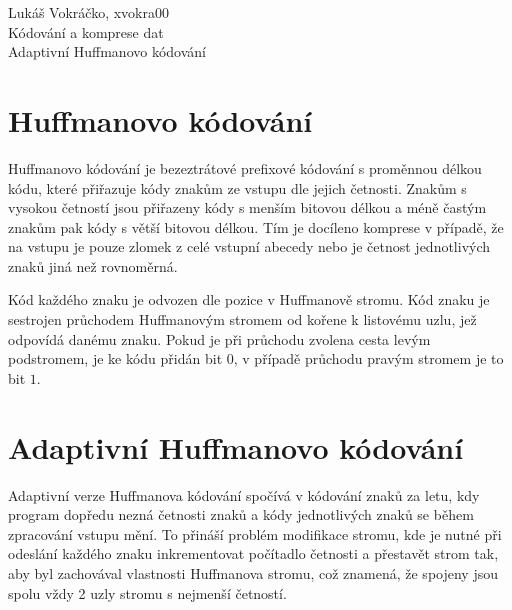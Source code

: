 \documentclass[12pt,a4paper,titlepage,final]{article}
\begin{document}
\newpage

\def\name{Lukáš Vokráčko}
\def\login{xvokra00}
\def\subject{Kódování a komprese dat}
\def\project{Adaptivní Huffmanovo kódování}


{
	\pagestyle{empty}
	
	\tableofcontents
	\newpage
	\pagestyle{plain}
}
{
	\pagestyle{plain}
	\vspace*{5px}
	\hfill \name, \login \\
	\vspace*{5px}
	{\LARGE \subject}  \\
	{\LARGE \project}  \\
}

\setcounter{page}{1}

\section{Huffmanovo kódování}
Huffmanovo kódování je bezeztrátové prefixové kódování s proměnnou délkou kódu, 
které přiřazuje kódy znakům ze vstupu dle jejich četnosti. Znakům s vysokou četností
jsou přiřazeny kódy s menším bitovou délkou a méně častým znakům pak kódy s větší bitovou délkou. 
Tím je docíleno komprese v případě, že na vstupu je pouze zlomek z celé vstupní abecedy
nebo je četnost jednotlivých znaků jiná než rovnoměrná.

Kód každého znaku je odvozen dle pozice v Huffmanově stromu. Kód znaku je sestrojen průchodem Huffmanovým stromem
od kořene k listovému uzlu, jež odpovídá danému znaku.
Pokud je při průchodu zvolena cesta levým podstromem, je ke kódu přidán bit $0$, v případě průchodu
pravým stromem je to bit $1$.

\section{Adaptivní Huffmanovo kódování}
Adaptivní verze Huffmanova kódování spočívá v kódování znaků za letu, kdy program dopředu nezná četnosti
znaků a kódy jednotlivých znaků se během zpracování vstupu mění. To přináší problém modifikace stromu,
kde je nutné při odeslání každého znaku inkrementovat počítadlo četnosti a přestavět strom tak, aby byl zachovával vlastnosti 
Huffmanova stromu, což znamená, že spojeny jsou spolu vždy 2 uzly stromu s nejmenší četností.
\end{document}
